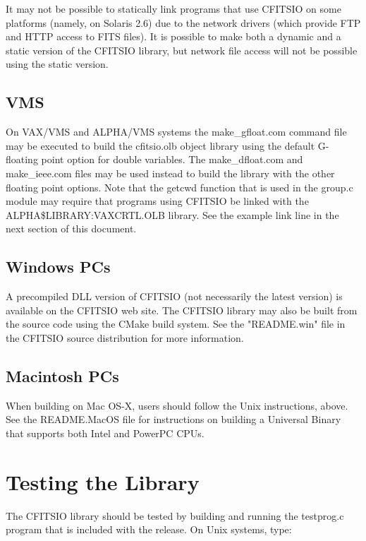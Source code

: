 \documentclass[11pt]{book}
\begin{document}
It may not be possible to statically link programs that use CFITSIO on
some platforms (namely, on Solaris 2.6) due to the network drivers
(which provide FTP and HTTP access to FITS files).  It is possible to
make both a dynamic and a static version of the CFITSIO library, but
network file access will not be possible using the static version.


\subsection{VMS}

On VAX/VMS and ALPHA/VMS systems the make\_gfloat.com command file may
be executed to build the cfitsio.olb object library using the default
G-floating point option for double variables.  The make\_dfloat.com and
make\_ieee.com files may be used instead to build the library with the
other floating point options. Note that the getcwd function that is
used in the group.c module may require that programs using CFITSIO be
linked with the ALPHA\$LIBRARY:VAXCRTL.OLB library.  See the example
link line in the next section of this document.


\subsection{Windows PCs}

A precompiled DLL version of CFITSIO (not necessarily the latest version)
is available on the CFITSIO web site.
The CFITSIO library may also be built from the source code using the
CMake build system.  See the "README.win" file in the CFITSIO source distribution
for more information.


\subsection{Macintosh PCs}

When building on Mac OS-X, users should follow the Unix instructions,
above.  See the README.MacOS file for instructions on building a Universal
Binary that supports both Intel and PowerPC CPUs.


\section{Testing the Library}

The CFITSIO library should be tested by building and running
the testprog.c program that is included with the release.
On Unix systems, type:
\end{document}
